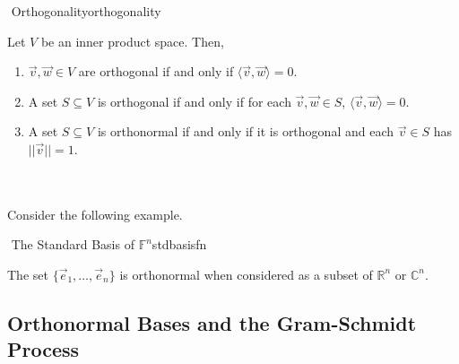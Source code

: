         \begin{definition}{\Stop\,\,Orthogonality}{orthogonality}

            Let \(V\) be an inner product space. Then, 
            \begin{enumerate}
                \item \(\vec{v},\vec{w}\in V\) are orthogonal if and only if \(\langle\vec{v},\vec{w}\rangle=0\).
                \item A set \(S\subseteq V\) is orthogonal if and only if for each \(\vec{v},\vec{w}\in S\), \(\langle\vec{v},\vec{w}\rangle=0\).
                \item A set \(S\subseteq V\) is orthonormal if and only if it is orthogonal and each \(\vec{v}\in S\) has \(||\vec{v}||=1\).
            \end{enumerate}

        \end{definition}
        \vphantom
        \\
        \\
        Consider the following example.
        \begin{example}{\Difficulty\,\,The Standard Basis of \(\mathbb{F}^n\)}{stdbasisfn}

            The set \(\{\vec{e}_1,\ldots,\vec{e}_n\}\) is orthonormal when considered as a subset of \(\mathbb{R}^n\) or \(\mathbb{C}^n\).
            
        \end{example}
        \pagebreak
        
    \subsection{Orthonormal Bases and the Gram-Schmidt Process}

